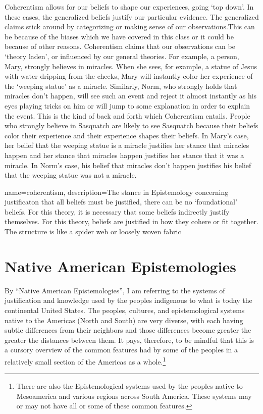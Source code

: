 Coherentism allows for our beliefs to shape our experiences, going `top down'. In these cases, the generalized beliefs justify our particular evidence. The generalized claims stick around by categorizing or making sense of our observations.This can be because of the biases which we have covered in this class or it could be because of other reasons. Coherentism claims that our observations can be `theory laden', or influenced by our general theories. For example, a person, Mary, strongly believes in miracles. When she sees, for example, a statue of Jesus with water dripping from the cheeks, Mary will instantly color her experience of the `weeping statue' as a miracle. Similarly, Norm, who strongly holds that miracles don't happen, will see such an event and reject it almost instantly as his eyes playing tricks on him or will jump to some explanation in order to explain the event. This is the kind of back and forth which Coherentism entails. People who strongly believe in Sasquatch are likely to see Sasquatch because their beliefs color their experience and their experience shapes their beliefs. In Mary's case, her belief that the weeping statue is a miracle justifies her stance that miracles happen and her stance that miracles happen justifies her stance that it was a miracle. In Norm's case, his belief that miracles don't happen justifies his belief that the weeping statue was not a miracle. 


{
name=coherentism,
description={The stance in Epistemology concerning justificaton that all beliefs must be justified, there can be no `foundational' beliefs. For this theory, it is necessary that some beliefs indirectly justify themselves. For this theory, beliefs are justified in how they cohere or fit together. The structure is like a spider web or loosely woven fabric}
}


\section{Native American Epistemologies}
By ``Native American Epistemologies'', I am referring to the systems of justification and knowledge used by the peoples indigenous to what is today the continental United States. The peoples, cultures, and epistemological systems native to the Americas (North and South) are very diverse, with each having subtle differences from their neighbors and those differences become greater the greater the distances between them. It pays, therefore, to be mindful that this is a cursory overview of the common features had by some of the peoples in a relatively small section of the Americas as a whole.\footnote{There are also the Epistemological systems used by the peoples native to Mesoamerica and various regions across South America. These systems may or may not have all or some of these common features.}  

